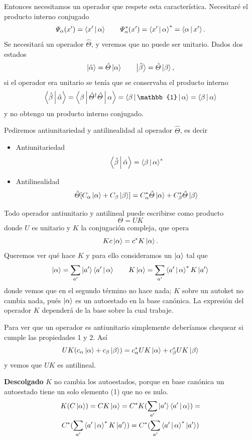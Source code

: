 \documentclass[10pt,oneside]{CBFT_book}
\begin{document}
Entonces necesitamos un operador que respete esta característica.
Necesitaré el producto interno conjugado 
\[
	\Psi_\alpha(x') = \Braket{x'|\alpha} \qquad
	\Psi^*_\alpha(x') = \Braket{x'|\alpha}^* = \Braket{\alpha|x'}.
\]
Se necesitará un operador $\hat{\Theta}$, y veremos que no puede ser unitario.
Dados dos estados
\[
	\Ket{\tilde{\alpha}} = \hat{\Theta}\Ket{\alpha} \qquad 
	\Ket{\tilde{\beta}} = \hat{\Theta}\Ket{\beta},
\]
si el operador era unitario se tenía que se conservaba el producto interno 
\[
	\Braket{\hat{\beta}|\hat{\alpha}} = 
	\Braket{\beta|\hat{\Theta}^\dagger\hat{\Theta}|\alpha} =
	\Braket{\beta|\mathbb{1}|\alpha} = \Braket{\beta|\alpha}
\]
y no obtengo un producto interno conjugado.

Pediremos antiunitariedad y antilinealidad al operador $\hat{\Theta}$, es decir
\begin{itemize}
 \item Antiunitariedad 
 \[
	\Braket{\hat{\beta}|\hat{\alpha}} = \Braket{{\beta}|{\alpha}}^*
\]
 \item Antilinealidad
\[
	\hat{\Theta}[ C_\alpha\Ket{\alpha} + C_\beta\Ket{\beta}] = 
	C_\alpha^*\hat{\Theta}\Ket{\alpha} + C_\beta^*\hat{\Theta}\Ket{\beta}
\]
\end{itemize}

Todo operador antiunitario y antilineal puede escribirse como producto 
\[
	\Theta = U K
\]
donde $U$ es unitario y $K$ la conjugación compleja, que opera
\[
	K c \Ket{\alpha} = c^* K \Ket{\alpha}.
\]
Queremos ver qué hace $K$ y para ello consideramos un $\Ket{\alpha}$ tal que
\[
	\Ket{\alpha} = \sum_{a'} \Ket{a'} \Braket{ a' | \alpha } \qquad 
	K \Ket{\alpha} = \sum_{a'}  \Braket{ a' | \alpha }^* K\Ket{a'}
\]
donde vemos que en el segundo término no hace nada; $K$ sobre un autoket no cambia nada, pués
$\Ket{\alpha}$ es un autoestado en la base canónica. La expresión del operador $K$ dependerá de la
base sobre la cual trabaje.

Para ver que un operador es antiunitario simplemente deberíamos chequear si cumple las propiedades
1 y 2. Así
\[
	UK ( c_\alpha \Ket{\alpha} + c_\beta \Ket{\beta} ) = 
	c_\alpha^* U K \Ket{\alpha} + c_\beta^* U K \Ket{\beta}
\]
y vemos que $UK$ es antilineal.


\begin{ejemplo}{\bf Descolgado}
$K$ no cambia los autoestados, porque en base canónica 
un autoestado tiene un solo elemento (1) que no es nulo.
\begin{multline*}
	K(C\Ket{\alpha}) = CK\Ket{\alpha} = C^*K(\sum_{a'} \Ket{a'}\Braket{a'|\alpha}) = \\
	C^* (\sum_{a'} \Braket{a'|\alpha}^* K \Ket{a'}) =
	C^* (\sum_{a'} \Braket{a'|\alpha}^* \Ket{a'})  
\end{multline*}

\end{ejemplo}
\end{document}
